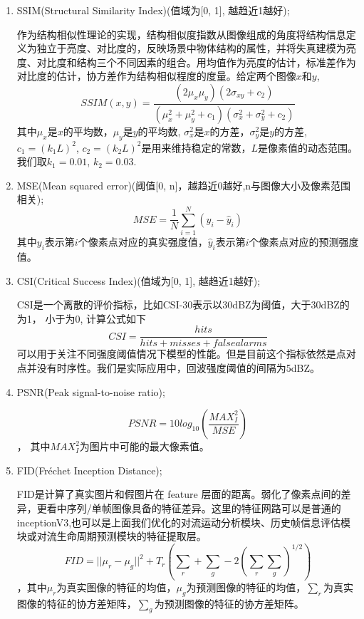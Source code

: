 \documentclass[10pt,english, openany]{book}
\begin{document}
\begin{enumerate}
    \item SSIM(Structural Similarity Index)(值域为[0, 1], 越趋近1越好);
    
    作为结构相似性理论的实现，结构相似度指数从图像组成的角度将结构信息定义为独立于亮度、对比度的，反映场景中物体结构的属性，并将失真建模为亮度、对比度和结构三个不同因素的组合。用均值作为亮度的估计，标准差作为对比度的估计，协方差作为结构相似程度的度量。给定两个图像$x$和$y$, 
    $$ SSIM(x, y) = \frac{(2\mu_{x}\mu_{y})(2\sigma_{xy}+c_2)}{(\mu_{x}^2 + \mu_{y}^2 + c_1)(\sigma_{x}^2 + \sigma_{y}^2 + c_2)} $$ 其中$\mu_x$是$x$的平均数，$\mu_y$是$y$的平均数, $\sigma_x^2$是$x$的方差，$\sigma_y^2$是$y$的方差, $c_1 = (k_1L)^2$, $c_2 = (k_2L)^2$是用来维持稳定的常数，$L$是像素值的动态范围。我们取$k_1 = 0.01$, $k_2 = 0.03$.

    \item MSE(Mean squared error)(阈值[0, n]，越趋近0越好,n与图像大小及像素范围相关);
    $$ MSE = \frac{1}{N} \sum_{i=1}^{N} (y_i - \hat{y}_i) $$ 其中$y_i$表示第$i$个像素点对应的真实强度值，$\hat{y}_i$表示第$i$个像素点对应的预测强度值。
    
    \item CSI(Critical Success Index)(值域为[0, 1], 越趋近1越好);
    
    CSI是一个离散的评价指标，比如CSI-30表示以30dBZ为阈值，大于30dBZ的为1， 小于为0, 计算公式如下 $$CSI = \frac{hits}{hits+misses+falsealarms}$$ 可以用于关注不同强度阈值情况下模型的性能。但是目前这个指标依然是点对点并没有时序性。我们是实际应用中，回波强度阈值的间隔为5dBZ。
    
    \item PSNR(Peak signal-to-noise ratio);
    
    $$PSNR = 10 log_{10}(\frac{MAX_I^2}{MSE})$$， 其中$MAX_I^2$为图片中可能的最大像素值。
    
    \item FID(Fréchet Inception Distance);
    
    FID是计算了真实图片和假图片在 feature 层面的距离。弱化了像素点间的差异，更看中序列/单帧图像具备的特征差异。这里的特征网路可以是普通的inceptionV3,也可以是上面我们优化的对流运动分析模块、历史帧信息评估模块或对流生命周期预测模块的特征提取层。$$ FID = || \mu_r - \mu_g ||^2 + T_r(\sum_r + \sum_g - 2(\sum_r \sum_g)^{1/2} )$$，其中$\mu_r$为真实图像的特征的均值，$\mu_g$为预测图像的特征的均值，$\sum_r$为真实图像的特征的协方差矩阵，$\sum_g$为预测图像的特征的协方差矩阵。
    

\end{enumerate}
\end{document}
